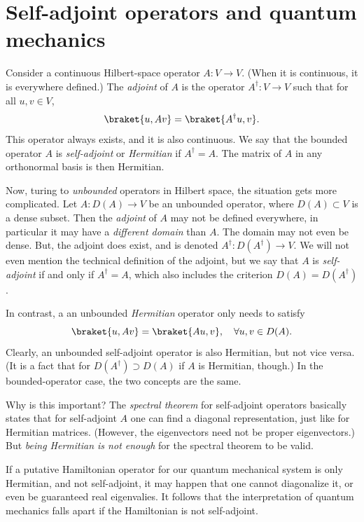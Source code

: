 \section{Self-adjoint operators and quantum mechanics}
\label{sec:self-adjoint and quantum}



Consider a continuous Hilbert-space operator $A : V \to V$. (When it is continuous, it is everywhere defined.) The \emph{adjoint} of $A$ is the operator $A^\dag : V\to V$ such that for all $u,v\in V$, 
\begin{equation}
    \braket{u,Av} = \braket{A^\dag u,v}.
\end{equation}
This operator always exists, and it is also continuous. We say that the bounded operator $A$ is \emph{self-adjoint} or \emph{Hermitian} if $A^\dag = A$. The matrix of $A$ in any orthonormal basis is then Hermitian.


Now, turing to \emph{unbounded} operators in Hilbert space, the situation gets more complicated. Let $A : D(A) \to V$ be an unbounded operator, where $D(A)\subset V$ is a dense subset. Then the \emph{adjoint} of $A$ may not be defined everywhere, in particular it may have a \emph{different domain} than $A$. The domain may not even be dense. But, the adjoint does exist, and is denoted $A^\dag : D(A^\dag) \to V$. We will not even mention the technical definition of the adjoint, but we say that $A$ is \emph{self-adjoint} if and only if $A^\dag = A$, which also includes the criterion $D(A) = D(A^\dag)$.

In contrast, a an unbounded \emph{Hermitian} operator only needs to satisfy
\begin{equation}
    \braket{u,Av} = \braket{Au,v}, \quad \forall u,v\in D(A).
\end{equation}
Clearly, an unbounded self-adjoint operator is also Hermitian, but not vice versa. (It is a fact that for $D(A^\dag) \supset D(A)$ if $A$ is Hermitian, though.) In the bounded-operator case, the two concepts are the same. 


Why is this important? The \emph{spectral theorem} for self-adjoint operators basically states that for self-adjoint $A$ one can find a diagonal representation, just like for Hermitian matrices. (However, the eigenvectors need not be proper eigenvectors.) But \emph{being Hermitian is not enough} for the spectral theorem to be valid.

If a putative Hamiltonian operator for our quantum mechanical system is only Hermitian, and not self-adjoint, it may happen that one cannot diagonalize it, or even be guaranteed real eigenvalies. It follows that the interpretation of quantum mechanics falls apart if the Hamiltonian is not self-adjoint.






